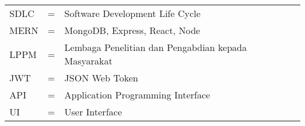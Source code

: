 \begin{center}
\end{center}

\begin{tabular}{llp{3in}}
	SDLC &  \hspace{1.5cm} = &	Software Development Life Cycle\\
	MERN	&  \hspace{1.5cm} = &	MongoDB, Express, React, Node\\
	LPPM	&  \hspace{1.5cm} = &	Lembaga Penelitian dan Pengabdian kepada Masyarakat\\
	JWT & \hspace{1.5cm} = & JSON Web Token\\
	API & \hspace{1.5cm} = & Application Programming Interface\\
	UI & \hspace{1.5cm} = & User Interface\\
		
\end{tabular}
